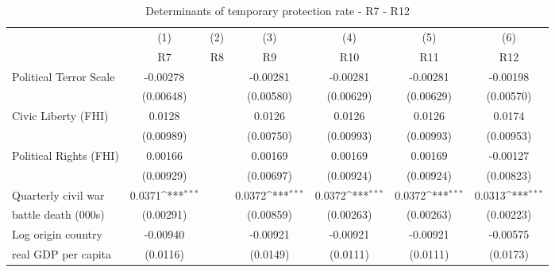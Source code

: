 \begin{table}[!ht]\centering \scriptsize
\def\sym#1{\ifmmode^{#1}\else\(^{#1}\)\fi}
\caption{Determinants of temporary protection rate - R7 - R12}
\begin{tabular}{l*{6}{c}}
\hline\hline
	&\multicolumn{1}{c}{(1)}     &\multicolumn{1}{c}{(2)}       &\multicolumn{1}{c}{(3)}       &\multicolumn{1}{c}{(4)}    	&\multicolumn{1}{c}{(5)}  	&\multicolumn{1}{c}{(6)}   \\
                    &\multicolumn{1}{c}{R7}&\multicolumn{1}{c}{R8}&\multicolumn{1}{c}{R9}&\multicolumn{1}{c}{R10}&\multicolumn{1}{c}{R11}&\multicolumn{1}{c}{R12}\\    
\hline
Political Terror Scale&    -0.00278         &                     &    -0.00281         &    -0.00281         &    -0.00281         &    -0.00198         \\
                    &   (0.00648)         &                     &   (0.00580)         &   (0.00629)         &   (0.00629)         &   (0.00570)         \\
[0,5em]
Civic Liberty (FHI) &      0.0128         &                     &      0.0126         &      0.0126         &      0.0126         &      0.0174         \\
                    &   (0.00989)         &                     &   (0.00750)         &   (0.00993)         &   (0.00993)         &   (0.00953)         \\
[0,5em]
Political Rights (FHI)&     0.00166         &                     &     0.00169         &     0.00169         &     0.00169         &    -0.00127         \\
                    &   (0.00929)         &                     &   (0.00697)         &   (0.00924)         &   (0.00924)         &   (0.00823)         \\
[0,5em]
Quarterly civil war &      0.0371\sym{***}&                     &      0.0372\sym{***}&      0.0372\sym{***}&      0.0372\sym{***}&      0.0313\sym{***}\\
battle death (000s)                    &   (0.00291)         &                     &   (0.00859)         &   (0.00263)         &   (0.00263)         &   (0.00223)         \\
[0,5em]
Log origin country &    -0.00940         &                     &    -0.00921         &    -0.00921         &    -0.00921         &    -0.00575         \\
real GDP per capita                    &    (0.0116)         &                     &    (0.0149)         &    (0.0111)         &    (0.0111)         &    (0.0173)         \\

\end{tabular}
\end{table}
